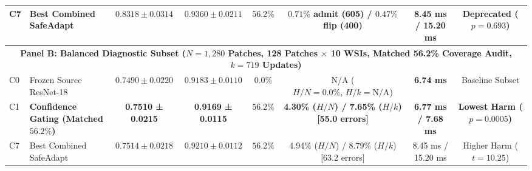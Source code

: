 \documentclass[conference]{IEEEtran}
\begin{document}
\begin{table}[t]
{\begin{tabular}{llcccccc}
C7 & Best Combined SafeAdapt & $0.8318 \pm 0.0314$ & $0.9360 \pm 0.0211$ & $56.2\%$ & $0.71\%$ admit (605) / $0.47\%$ flip (400) & 8.45 ms / 15.20 ms & Deprecated ($p=0.693$) \\
\midrule
\multicolumn{8}{c}{\textbf{Panel B: Balanced Diagnostic Subset ($N=1{,}280$ Patches, 128 Patches $\times$ 10 WSIs, Matched 56.2\% Coverage Audit, $k=719$ Updates)}} \\
\midrule
C0 & Frozen Source ResNet-18 & $0.7490 \pm 0.0220$ & $0.9183 \pm 0.0110$ & $0.0\%$ & N/A ($H/N=0.0\%,\, H/k=\text{N/A}$) & \textbf{6.74 ms} & Baseline Subset \\
C1 & \textbf{Confidence Gating (Matched $56.2\%$)} & \textbf{0.7510 ± 0.0215} & \textbf{0.9169 ± 0.0115} & $56.2\%$ & \textbf{4.30\% ($H/N$) / 7.65\% ($H/k$) [55.0 errors]} & \textbf{6.77 ms / 7.68 ms} & \textbf{Lowest Harm ($p=0.0005$)} \\
C7 & Best Combined SafeAdapt & $0.7514 \pm 0.0218$ & $0.9210 \pm 0.0112$ & $56.2\%$ & 4.94\% ($H/N$) / 8.79\% ($H/k$) [63.2 errors] & 8.45 ms / 15.20 ms & Higher Harm ($t=10.25$) \\
\bottomrule
\end{tabular}%
}
\end{table}
\end{document}
